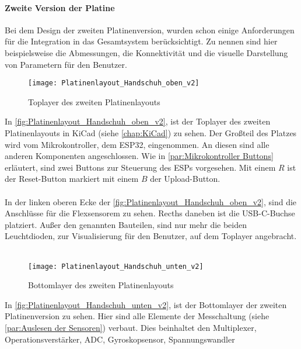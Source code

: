 \documentclass[titlepage,12pt,twoside]{article}
\begin{document}
\paragraph{Zweite Version der Platine}
\hfill \break
\hfill \break
Bei dem Design der zweiten Platinenversion, wurden schon einige Anforderungen für die Integration in das Gesamtsystem
berücksichtigt. Zu nennen sind hier beispielsweise die Abmessungen, die Konnektivität und die visuelle Darstellung 
von Parametern für den Benutzer. 

\begin{figure}[H]
	\begin{center}
		\scalebox{0.8}
		{\texttt{[image: Platinenlayout\_Handschuh\_oben\_v2]}}
		\caption{Toplayer des zweiten Platinenlayouts}
		\label{fig:Platinenlayout_Handschuh_oben_v2}		
	\end{center}
\end{figure}
\hfill \break
In \autoref{fig:Platinenlayout_Handschuh_oben_v2}, ist der Toplayer des zweiten Platinenlayouts in KiCad (siehe \autoref{chap:KiCad}) zu sehen.
Der Großteil des Platzes wird vom Mikrokontroller, dem ESP32, eingenommen. An diesen sind alle anderen Komponenten angeschlossen. Wie in 
\autoref{par:Mikrokontroller Buttons} erläutert, sind zwei Buttons zur Steuerung des ESPs vorgesehen. Mit einem $R$ ist der Reset-Button markiert
mit einem $B$ der Upload-Button. \\
\\
In der linken oberen Ecke der \autoref{fig:Platinenlayout_Handschuh_oben_v2}, sind die Anschlüsse für die Flexsensorem zu sehen. Recths daneben
ist die USB-C-Buchse platziert. Außer den genannten Bauteilen, sind nur mehr die beiden Leuchtdioden, zur Visualisierung für den Benutzer, auf dem 
Toplayer angebracht. \\
\\
\begin{figure}[H]
	\begin{center}
		\scalebox{0.8}
		{\texttt{[image: Platinenlayout\_Handschuh\_unten\_v2]}}
		\caption{Bottomlayer des zweiten Platinenlayouts}
		\label{fig:Platinenlayout_Handschuh_unten_v2}		
	\end{center}
\end{figure}
\hfill \break
In \autoref{fig:Platinenlayout_Handschuh_unten_v2}, ist der Bottomlayer der zweiten Platinenversion zu sehen. Hier sind alle Elemente der Messchaltung
(siehe \autoref{par:Auslesen der Sensoren}) verbaut. Dies beinhaltet den Multiplexer, Operationsverstärker, ADC, Gyroskopsensor, Spannungswandler
\end{document}
